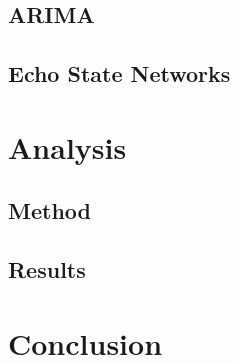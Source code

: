 \documentclass{article}
\begin{document}
\subsection{ARIMA}
\subsection{Echo State Networks}

\section{Analysis}

\subsection{Method}
\subsection{Results}

\section{Conclusion}



\end{document}
